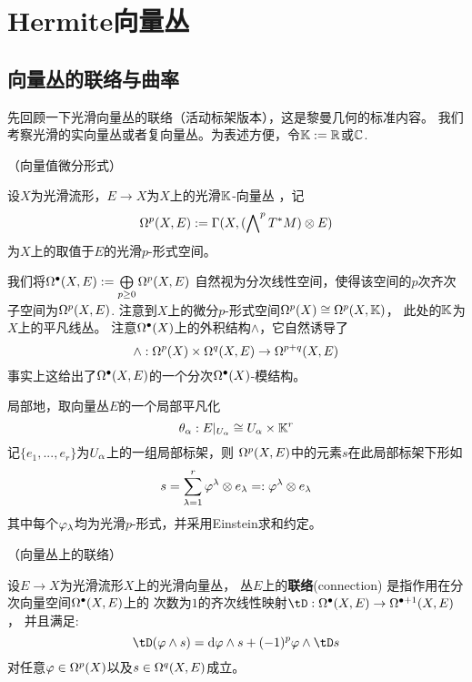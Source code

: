 \chapter{Hermite向量丛}
\section{向量丛的联络与曲率}

先回顾一下光滑向量丛的联络（活动标架版本），这是黎曼几何的标准内容。
我们考察光滑的实向量丛或者复向量丛。为表述方便，令$\mathbb{K}:=\mathbb{R}$或$\mathbb{C}$.

\begin{notation}（向量值微分形式）

设$X$为光滑流形，$E\to X$为$X$上的光滑$\mathbb{K}$-向量丛
，记$$\Omega^p(X,E):=\Gamma(X,(\bigwedge\nolimits^{p}T^*M)\otimes E)$$
为$X$上的取值于$E$的光滑$p$-形式空间。
\end{notation}

我们将$\Omega^{\bullet}(X,E):=\bigoplus\limits_{p\geq 0}\Omega^p(X,E)$
自然视为分次线性空间，使得该空间的$p$次齐次子空间为$\Omega^p(X,E)$.
注意到$X$上的微分$p$-形式空间$\Omega^p(X)\cong\Omega^p(X,\mathbb{K})$，
此处的$\mathbb{K}$为$X$上的平凡线丛。
注意$\Omega^{\bullet}(X)$上的外积结构$\wedge$，它自然诱导了
$$
  \wedge:
  \Omega^p(X)\times\Omega^q(X,E)
  \to\Omega^{p+q}(X,E)
$$
事实上这给出了$\Omega^{\bullet}(X,E)$的一个分次$\Omega^{\bullet}(X)$-模结构。

局部地，取向量丛$E$的一个局部平凡化
$$\theta_{\alpha}:E|_{U_{\alpha}}\cong U_{\alpha}\times \mathbb{K}^{r}$$
记$\{e_1,...,e_r\}$为$U_\alpha$上的一组局部标架，则
$\Omega^p(X,E)$中的元素$s$在此局部标架下形如
$$s=\sum_{\lambda=1}^r\varphi^{\lambda}\otimes e_{\lambda}
=:\varphi^\lambda\otimes e_\lambda$$
其中每个$\varphi_\lambda$均为光滑$p$-形式，并采用Einstein求和约定。


\begin{definition}（向量丛上的联络）

设$E\to X$为光滑流形$X$上的光滑向量丛，
丛$E$上的\textbf{联络}(connection)
是指作用在分次向量空间$\Omega^{\bullet}(X,E)$上的
次数为$1$的齐次线性映射$\tD:\Omg\updot(X,E)
\to\Omg^{\bullet+1}(X,E)$，
并且满足:
$$
  \tD(\fai\wedge s)
=
  \td\fai\wedge s
 +(-1)^p\fai\wedge\tD s
$$
对任意$\varphi\in\Omega^p(X)$以及$s\in\Omega^q(X,E)$成立。
\end{definition}

